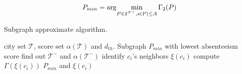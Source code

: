  \begin{equation}
 P_{min}=\arg\!\min\limits_{P\in 2^\mathcal{T^-}, s(P)\leq A}\Gamma_2(P)
\end{equation}

\begin{algorithm}[h]
	\centering
	\captionsetup{font=scriptsize}
	\caption{Subgraph approximate algorithm.}
	{\footnotesize \begin{algorithmic}[1]
			 city set $\mathcal{T}$, score set $\alpha(\mathcal{T})$ and $d_{th}$.
			 Subgraph $P_{min}$ with lowest absenteeism score
			\STATE find out $\mathcal{T}^-$ and $\alpha(\mathcal{T}^-)$
			\STATE identify $c_i$'s neighbors $\xi(c_i)$
			\STATE compute $\Gamma(\xi(c_i))$ 	
			\ENDFOR
			\RETURN ${P_{min}}$  and $\xi(c_i)$
		\end{algorithmic}}
		\label{algo:Subgraph}
	\end{algorithm}
	

